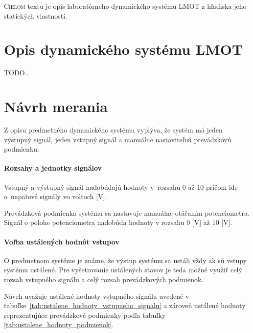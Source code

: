 \documentclass[a4paper, 10pt, ]{article}
\begin{document}
\bigskip

\normalsize
\normalfont

\lstset{style=mystyle}










\noindent
\lettrine[lines=1, nindent=1pt, loversize=0.0]{C}{ieľom} 
textu je opis laboratórneho dynamického systému LMOT z hľadiska jeho statických vlastností.


\section{Opis dynamického systému LMOT}

TODO\ldots


\section{Návrh merania}

Z opisu predmetného dynamického systému vyplýva, že systém má jeden výstupný signál, jeden vstupný signál a manuálne nastaviteľnú prevádzkovú podmienku.

\paragraph{Rozsahy a jednotky signálov}

Vstupný a výstupný signál nadobúdajú hodnoty v~rozsahu $0$ až $10$ pričom ide o~napäťové signály vo voltoch [V].

Prevádzková podmienka systému sa nastavuje manuálne otáčaním potenciometra. Signál o polohe potenciometra nadobúda hodnoty v rozsahu $0$ [V] až $10$ [V].

\paragraph{Voľba ustálených hodnôt vstupov}

O predmetnom systéme je známe, že výstup systému sa ustáli vždy ak sú vstupy systému ustálené. Pre vyšetrovanie ustálených stavov je teda možné využiť celý rozsah vstupného signálu a celý rozsah prevádzkových podmienok.

Návrh uvažuje ustálené hodnoty vstupného signálu uvedené v tabuľke~\ref{tab:ustalene_hodnoty_vstupneho_signalu} a zároveň ustálené hodnoty reprezentujúce prevádzkové podmienky podľa tabuľky \ref{tab:ustalene_hodnoty_podmienok}.
\end{document}
